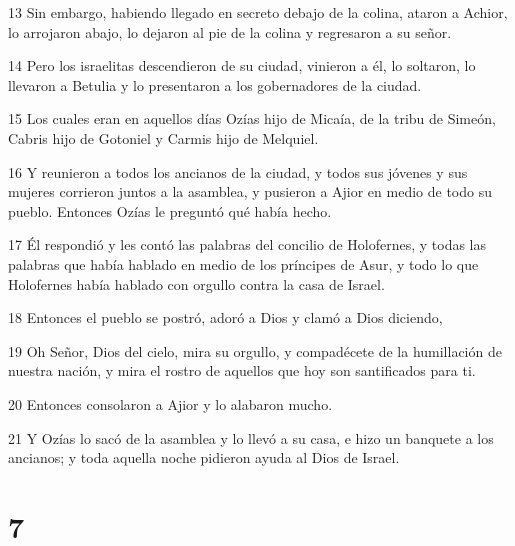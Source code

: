 \par 13 Sin embargo, habiendo llegado en secreto debajo de la colina, ataron a Achior, lo arrojaron abajo, lo dejaron al pie de la colina y regresaron a su señor.
\par 14 Pero los israelitas descendieron de su ciudad, vinieron a él, lo soltaron, lo llevaron a Betulia y lo presentaron a los gobernadores de la ciudad.
\par 15 Los cuales eran en aquellos días Ozías hijo de Micaía, de la tribu de Simeón, Cabris hijo de Gotoniel y Carmis hijo de Melquiel.
\par 16 Y reunieron a todos los ancianos de la ciudad, y todos sus jóvenes y sus mujeres corrieron juntos a la asamblea, y pusieron a Ajior en medio de todo su pueblo. Entonces Ozías le preguntó qué había hecho.
\par 17 Él respondió y les contó las palabras del concilio de Holofernes, y todas las palabras que había hablado en medio de los príncipes de Asur, y todo lo que Holofernes había hablado con orgullo contra la casa de Israel.
\par 18 Entonces el pueblo se postró, adoró a Dios y clamó a Dios diciendo,
\par 19 Oh Señor, Dios del cielo, mira su orgullo, y compadécete de la humillación de nuestra nación, y mira el rostro de aquellos que hoy son santificados para ti.
\par 20 Entonces consolaron a Ajior y lo alabaron mucho.
\par 21 Y Ozías lo sacó de la asamblea y lo llevó a su casa, e hizo un banquete a los ancianos; y toda aquella noche pidieron ayuda al Dios de Israel.

\chapter{7}

